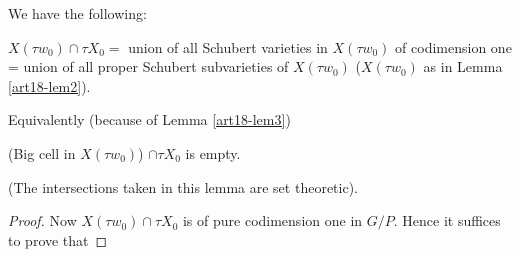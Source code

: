 \begin{lem}\label{art18-lem4}
We have the following:

$X(\tau w_0) \cap \tau X_0 =$ union of all Schubert varieties in $X(\tau w_0)$ of codimension one = union of all proper Schubert subvarieties of $X(\tau w_0)$ ($X(\tau w_0)$ as in Lemma \ref{art18-lem2}).

Equivalently (because of Lemma \ref{art18-lem3})

(Big cell in $X(\tau w_0)$) $\cap \tau X_0$ is empty.
\end{lem}

(The intersections taken in this lemma are set theoretic).

\begin{proof}
Now $X(\tau w_0) \cap \tau X_0$ is of pure codimension one in $G/P$. Hence it suffices to prove that 


\end{proof}
